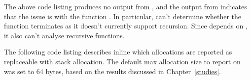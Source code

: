

The above code listing produces no output from , and the output from  indicates that the issue is with the function . In particular,  can't determine whether the function terminates as it doesn't currently support recursion. Since  depends on , it also can't analyse recursive functions.

The following code listing describes inline which allocations are reported as replaceable with stack allocation. The default max allocation size to report on was set to 64 bytes, based on the results discussed in Chapter~\ref{studies}.



